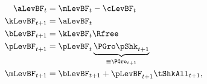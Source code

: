   \begin{gather}\label{eq:DBCparts}
    \begin{align}
      \aLevBF_{t}    & = \mLevBF_{t}-\cLevBF_{t}   \\
      \kLevBF_{t+1}   & = \aLevBF_{t} \notag \\
      \bLevBF_{t+1}    & = \kLevBF_{t} \Rfree \notag \\
      \pLevBF_{t+1}  & = \pLevBF_{t} \underbrace{\PGro\pShk_{t+1}}_{\equiv \PGro_{t+1}}  \notag \\
      \mLevBF_{t+1}  & =  \bLevBF_{t+1} +\pLevBF_{t+1}\tShkAll_{t+1},  \notag
    \end{align}
  \end{gather}
